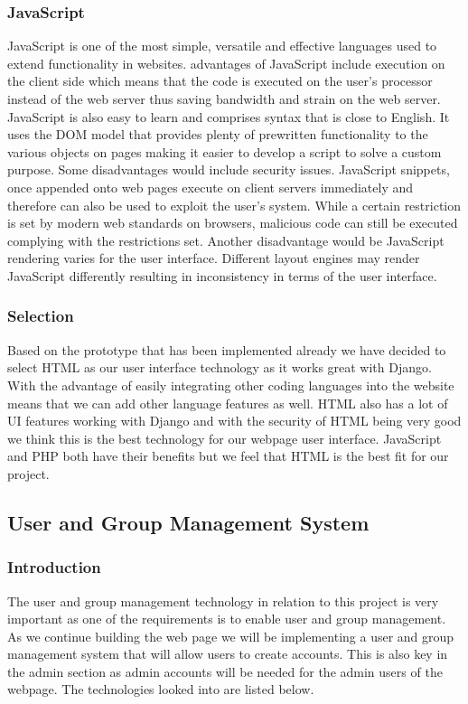 \documentclass[draftclsnofoot,10pt,onecolumn]{IEEEtran} %
\begin{document}
\subsubsection{JavaScript}
JavaScript is one of the most simple, versatile and effective languages used to extend functionality in websites. advantages of
JavaScript include execution on the client side which means that the code is executed on the user's processor instead of the
web server thus saving bandwidth and strain on the web server. JavaScript is also easy to learn and comprises syntax that is
close to English. It uses the DOM model that provides plenty of prewritten functionality to the various objects on pages
making it easier to develop a script to solve a custom purpose. Some disadvantages would include security issues. JavaScript
snippets, once appended onto web pages execute on client servers immediately and therefore can also be used to exploit the
user's system. While a certain restriction is set by modern web standards on browsers, malicious code can still be executed
complying with the restrictions set. Another disadvantage would be JavaScript rendering varies for the user interface.
Different layout engines may render JavaScript differently resulting in inconsistency in terms of the user interface. \\

\subsubsection{Selection}
Based on the prototype that has been implemented already we have decided to select HTML as our user interface technology
as it works great with Django. With the advantage of easily integrating other coding languages into the website means that
we can add other language features as well. HTML also has a lot of UI features working with Django and with the security of
HTML being very good we think this is the best technology for our webpage user interface. JavaScript and PHP both have
their benefits but we feel that HTML is the best fit for our project. 

\subsection{User and Group Management System}

\subsubsection{Introduction}
The user and group management technology in relation to this project is very important as one of the requirements is to
enable user and group management. As we continue building the web page we will be implementing a user and group
management system that will allow users to create accounts. This is also key in the admin section as admin accounts will be
needed for the admin users of the webpage. The technologies looked into are listed below.
\end{document}
